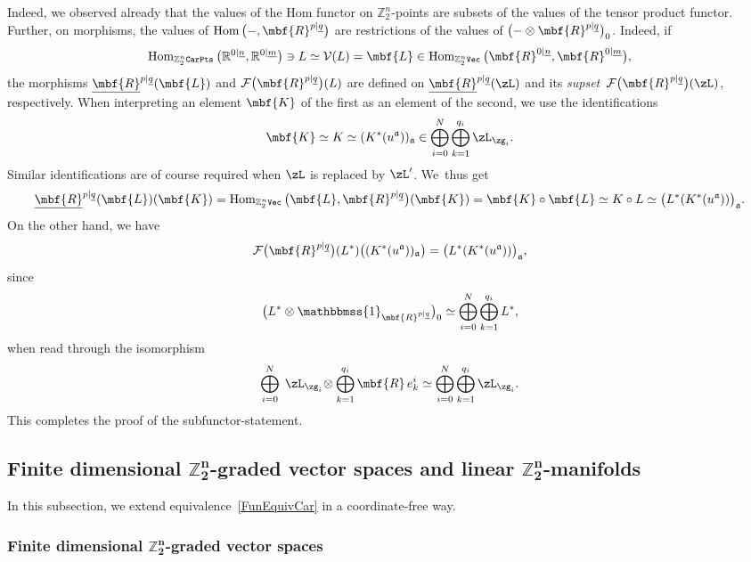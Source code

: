 \documentclass[10pt,a4paper]{amsart}
\newcommand{\Id}{\mathbbmss{1}}
\newcommand{\op}[1]{\operatorname{#1}}
\newcommand{\R}{{\mathbb R}}
\newcommand{\Z}{{\mathbb Z}}
\def\ul{\underline}
\def\cF{\mathcal{F}}
\def\ul{\underline}
\newcommand{\0}{\otimes}
\newcommand{\z}{\Z_2^n}
\numberwithin{equation}{section}
\begin{document}
Indeed, we observed already that the values of the Hom functor on $\Z_2^n$-points are subsets of the values of the tensor product functor. Further, on morphisms, the values of $\op{Hom}\big({-},\mbf{R}^{p|\ul q}\big)$ are restrictions of the values of $\big({-}\0\mbf{R}^{p|\ul q}\big)_0$. Indeed, if
\[
\op{Hom}_{\z\tt CarPts}\big(\R^{0|\ul n},\R^{0|\ul m}\big)\ni L\simeq \mathcal{V}(L)=\mbf{L}\in\op{Hom}_{\z\tt Vec}\big(\mbf{R}^{0|\ul n},\mbf{R}^{0|\ul m}\big),
\]
the morphisms $\ul{\mbf{R}}^{p|\ul q}(\mbf{L})$ and $\cF\big(\mbf{R}^{p|\ul q}\big)(L)$ are defined on $\ul{\mbf{R}}^{p|\ul q}(\zL)$ and its {\it supset} $\,\cF\big(\mbf{R}^{p|\ul q}\big)(\zL)$, respectively. When interpreting an element $\mbf{K}$ of the first as an element of the second, we use the identifications
\[
\mbf{K}\simeq K\simeq (K^*(u^{\mathfrak a}))_{\mathfrak a}\in\bigoplus_{i=0}^N\bigoplus_{k=1}^{q_i}\zL_{\zg_i}.
\]
Similar identifications are of course required when $\zL$ is replaced by $\zL'$. We~thus get
\[
\ul{\mbf{R}}^{p|\ul q}(\mbf{L})(\mbf{K})=\op{Hom}_{\z\tt Vec}\big(\mbf{L},\mbf{R}^{p|\ul q}\big)(\mbf{K})=\mbf{K}\circ\mbf{L}\simeq K\circ L\simeq \big(L^*(K^*(u^{\mathfrak a}))\big)_{\mathfrak a}.
\]
On the other hand, we have
\[
\cF\big(\mbf{R}^{p|\ul q}\big)(L^*)\big((K^*(u^{\mathfrak{a}}))_{\mathfrak{a}}\big) =\big(L^*(K^*(u^{\mathfrak{a}}))\big)_{\mathfrak{a}},
\]
since
\[
\big(L^*\0\Id_{\mbf{R}^{p|\ul q}}\big)_0\simeq \bigoplus_{i=0}^N\bigoplus_{k=1}^{q_i}L^*,
\]
when read through the isomorphism
\[
\bigoplus_{i=0}^N\;\zL_{\zg_i}\!\0\bigoplus_{k=1}^{q_i}\mbf{R}\,e^i_k\simeq \bigoplus_{i=0}^N\bigoplus_{k=1}^{q_i}\zL_{\zg_i}.
\]
This completes the proof of the subfunctor-statement.

\subsection[Finite dimensional Z2n-graded vector spaces and linear Z2n-manifolds]
{Finite dimensional $\boldsymbol{\Z_2^n}$-graded vector spaces and linear $\boldsymbol{\Z_2^n}$-manifolds}

In this subsection, we extend equivalence~\eqref{FunEquivCar} in a coordinate-free way.

\newcommand{\bbN}{\mathbb{N}}

\subsubsection[Finite dimensional Z2n-graded vector spaces]
{Finite dimensional $\boldsymbol{\Z_2^n}$-graded vector spaces}
\end{document}
